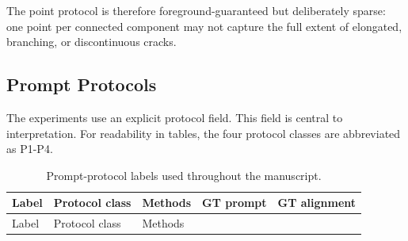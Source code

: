 \documentclass[applsci,article,submit,pdftex,moreauthors]{Definitions/mdpi}
\begin{document}
The point protocol is therefore foreground-guaranteed but deliberately
sparse: one point per connected component may not capture the full
extent of elongated, branching, or discontinuous cracks.

\subsection{Prompt Protocols}

The experiments use an explicit protocol field. This field is central to
interpretation. For readability in tables, the four protocol classes are
abbreviated as P1-P4.

\begin{longtable}[]{@{}
  >{\raggedright\arraybackslash}p{}
  >{\raggedright\arraybackslash}p{}
  >{\raggedright\arraybackslash}p{}
  >{\raggedleft\arraybackslash}p{}
  >{\raggedleft\arraybackslash}p{}@{}}
\caption{Prompt-protocol labels used throughout the
manuscript.}\tabularnewline
\toprule\noalign{}
\begin{minipage}[b]{\linewidth}\raggedright
Label
\end{minipage} & \begin{minipage}[b]{\linewidth}\raggedright
Protocol class
\end{minipage} & \begin{minipage}[b]{\linewidth}\raggedright
Methods
\end{minipage} & \begin{minipage}[b]{\linewidth}\raggedleft
GT prompt
\end{minipage} & \begin{minipage}[b]{\linewidth}\raggedleft
GT alignment
\end{minipage} \\
\midrule\noalign{}
\endfirsthead
\toprule\noalign{}
\begin{minipage}[b]{\linewidth}\raggedright
Label
\end{minipage} & \begin{minipage}[b]{\linewidth}\raggedright
Protocol class
\end{minipage} & \begin{minipage}[b]{\linewidth}\raggedright
Methods
\end{minipage} & \begin{minipage}[b]{\linewidth}\raggedleft

\end{minipage}
\end{longtable}
\end{document}
